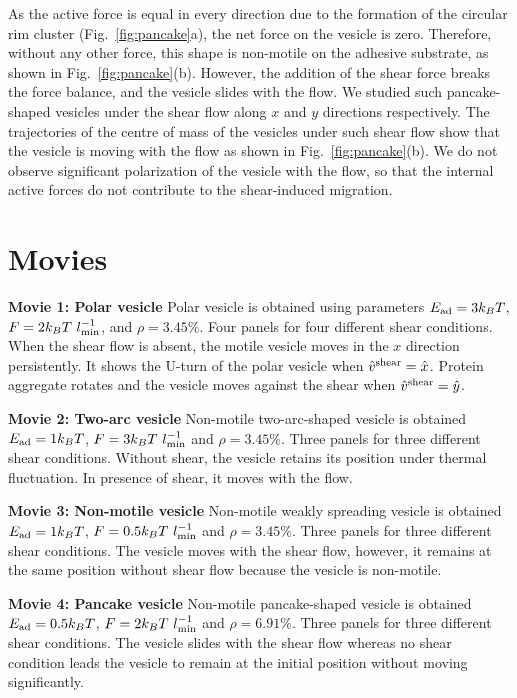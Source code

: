 \documentclass[aps,article,amsmath]{revtex4-2}
\begin{document}
As the active force is equal in every direction due to the formation of the circular rim cluster (Fig.~\ref{fig:pancake}a), the net force on the vesicle is zero. Therefore, without any other force, this shape is non-motile on the adhesive substrate, as shown in Fig.~\ref{fig:pancake}(b). However, the addition of the shear force breaks the force balance, and the vesicle slides with the flow. We studied such pancake-shaped vesicles under the shear flow along $x$ and $y$ directions respectively. The trajectories of the centre of mass of the vesicles under such shear flow show that the vesicle is moving with the flow as shown in Fig.~\ref{fig:pancake}(b). We do not observe significant polarization of the vesicle with the flow, so that the internal active forces do not contribute to the shear-induced migration.

\section{Movies}
\textbf{Movie 1: Polar vesicle}
Polar vesicle is obtained using parameters $E_{\rm ad}=3 k_BT$, $F=2 k_BT~l_{\rm min}^{-1}$, and $\rho=3.45\%$. Four panels for four different shear conditions. When the shear flow is absent, the motile vesicle moves in the $x$ direction persistently. It shows the U-turn of the polar vesicle when $\hat{v}^{\rm shear}=\hat{x}$. Protein aggregate rotates and the vesicle moves against the shear when $\hat{v}^{\rm shear}=\hat{y}$.

\textbf{Movie 2: Two-arc vesicle}
Non-motile two-arc-shaped vesicle is obtained $E_{\rm ad}=1 k_BT$, $F=3 k_BT~l_{\rm min}^{-1}$ and $\rho=3.45\%$. Three panels for three different shear conditions. Without shear, the vesicle retains its position under thermal fluctuation. In presence of shear, it moves with the flow.

\textbf{Movie 3: Non-motile vesicle}
Non-motile weakly spreading vesicle is obtained $E_{\rm ad}=1 k_BT$, $F=0.5 k_BT~l_{\rm min}^{-1}$ and $\rho=3.45\%$. Three panels for three different shear conditions. The vesicle moves with the shear flow, however, it remains at the same position without shear flow because the vesicle is non-motile.

\textbf{Movie 4: Pancake vesicle}
Non-motile pancake-shaped vesicle is obtained $E_{\rm ad}=0.5 k_BT$, $F=2 k_BT~l_{\rm min}^{-1}$ and $\rho=6.91\%$. Three panels for three different shear conditions. The vesicle slides with the shear flow whereas no shear condition leads the vesicle to remain at the initial position without moving significantly.
\end{document}
